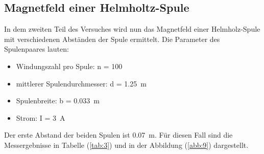 \subsection{Magnetfeld einer Helmholtz-Spule}

In dem zweiten Teil des Versuches wird nun das Magnetfeld einer Helmholz-Spule mit
verschiedenen Abständen der Spule ermittelt. Die Parameter des Spulenpaares lauten:

\begin{itemize}
  \item Windungszahl pro Spule: n = 100
  \item mittlerer Spulendurchmesser: d = \SI{1.25}{\meter}
  \item Spulenbreite: b = \SI{0.033}{\meter}
  \item Strom: I = \SI{3}{\ampere}
\end{itemize}

Der erste Abstand der beiden Spulen ist \SI{0.07}{\meter}. Für diesen Fall sind
die Messergebnisse in Tabelle (\ref{tab:3}) und in der Abbildung (\ref{abb:9})
dargestellt.

